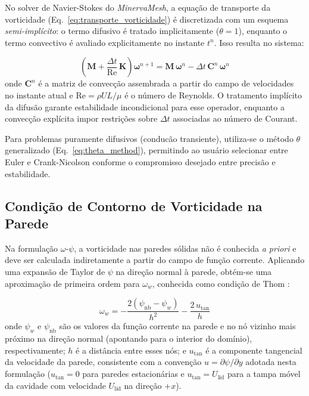 No solver de Navier-Stokes do \textit{MinervaMesh}, a equação de transporte da vorticidade (Eq.~\ref{eq:transporte_vorticidade}) é discretizada com um esquema \textit{semi-implícito}: o termo difusivo é tratado implicitamente ($\theta = 1$), enquanto o termo convectivo é avaliado explicitamente no instante $t^n$. Isso resulta no sistema:

\begin{equation}
\boxed{\left( \mathbf{M} + \frac{\Delta t}{\text{Re}} \, \mathbf{K} \right) \boldsymbol{\omega}^{n+1} = \mathbf{M} \, \boldsymbol{\omega}^n - \Delta t \, \mathbf{C}^n \, \boldsymbol{\omega}^n}
\label{eq:sistema_temporal_ns}
\end{equation}
onde $\mathbf{C}^n$ é a matriz de convecção assembrada a partir do campo de velocidades no instante atual e $\text{Re} = \rho U L / \mu$ é o número de Reynolds. O tratamento implícito da difusão garante estabilidade incondicional para esse operador, enquanto a convecção explícita impor restrições sobre $\Delta t$ associadas ao número de Courant.

Para problemas puramente difusivos (conducão transiente), utiliza-se o método $\theta$ generalizado (Eq.~\ref{eq:theta_method}), permitindo ao usuário selecionar entre Euler e Crank-Nicolson conforme o compromisso desejado entre precisão e estabilidade.

\subsection{Condição de Contorno de Vorticidade na Parede}
\label{sec:thom}

Na formulação $\omega$-$\psi$, a vorticidade nas paredes sólidas não é conhecida \textit{a priori} e deve ser calculada indiretamente a partir do campo de função corrente. Aplicando uma expansão de Taylor de $\psi$ na direção normal à parede, obtém-se uma aproximação de primeira ordem para $\omega_w$, conhecida como condição de Thom \cite{Thom1933}:

\begin{equation}
\omega_w = -\frac{2(\psi_{\text{nb}} - \psi_w)}{h^2} - \frac{2 \, u_{\text{tan}}}{h}
\label{eq:thom}
\end{equation}
onde $\psi_w$ e $\psi_{\text{nb}}$ são os valores da função corrente na parede e no nó vizinho mais próximo na direção normal (apontando para o interior do domínio), respectivamente; $h$ é a distância entre esses nós; e $u_{\text{tan}}$ é a componente tangencial da velocidade da parede, consistente com a convenção $u = \partial\psi/\partial y$ adotada nesta formulação ($u_{\text{tan}} = 0$ para paredes estacionárias e $u_{\text{tan}} = U_{\text{lid}}$ para a tampa móvel da cavidade com velocidade $U_{\text{lid}}$ na direção $+x$).

